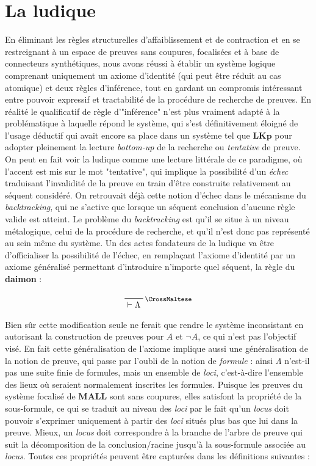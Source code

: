 \documentclass[12pt]{report}
\newcommand{\dai}{\text{\CrossMaltese}}
\newcommand{\seq}{\vdash}
\newcommand{\irule}[1]{\footnotesize$#1$}
\begin{document}

\chapter*{La ludique}

En éliminant les règles structurelles d'affaiblissement et de contraction et en se restreignant à un espace de preuves sans coupures, focalisées et à base de connecteurs synthétiques, nous avons réussi à établir un système logique comprenant uniquement un axiome d'identité (qui peut être réduit au cas atomique) et deux règles d'inférence, tout en gardant un compromis intéressant entre pouvoir expressif et tractabilité de la procédure de recherche de preuves. En réalité le qualificatif de règle d'"inférence" n'est plus vraiment adapté à la problématique à laquelle répond le système, qui s'est définitivement éloigné de l'usage déductif qui avait encore sa place dans un système tel que $\mathbf{LKp}$ pour adopter pleinement la lecture \textit{bottom-up} de la recherche ou \emph{tentative} de preuve.\\

On peut en fait voir la ludique comme une lecture littérale de ce paradigme, où l'accent est mis sur le mot "tentative", qui implique la possibilité d'un \emph{échec} traduisant l'invalidité de la preuve en train d'être construite relativement au séquent considéré. On retrouvait déjà cette notion d'échec dans le mécanisme du \textit{backtracking}, qui ne s'active que lorsque un séquent conclusion d'aucune règle valide est atteint. Le problème du \textit{backtracking} est qu'il se situe à un niveau métalogique, celui de la procédure de recherche, et qu'il n'est donc pas représenté au sein même du système. Un des actes fondateurs de la ludique va être d'officialiser la possibilité de l'échec, en remplaçant l'axiome d'identité par un axiome généralisé permettant d'introduire n'importe quel séquent, la règle du \textbf{daimon} :

\begin{displaymath}
	\prftree[r]{\irule{\dai}}
		{\seq \Lambda}
\end{displaymath}

Bien sûr cette modification seule ne ferait que rendre le système inconsistant en autorisant la construction de preuves pour $A$ et $\neg A$, ce qui n'est pas l'objectif visé. En fait cette généralisation de l'axiome implique aussi une généralisation de la notion de preuve, qui passe par l'oubli de la notion de \emph{formule} : ainsi $\Lambda$ n'est-il pas une suite finie de formules, mais un ensemble de \textit{loci}, c'est-à-dire l'ensemble des lieux où seraient normalement inscrites les formules. Puisque les preuves du système focalisé de $\mathbf{MALL}$ sont sans coupures, elles satisfont la propriété de la sous-formule, ce qui se traduit au niveau des \textit{loci} par le fait qu'un \textit{locus} doit pouvoir s'exprimer uniquement à partir des \textit{loci} situés plus bas que lui dans la preuve. Mieux, un \textit{locus} doit correspondre à la branche de l'arbre de preuve qui suit la décomposition de la conclusion/racine jusqu'à la sous-formule associée au \textit{locus}. Toutes ces propriétés peuvent être capturées dans les définitions suivantes :
\end{document}
